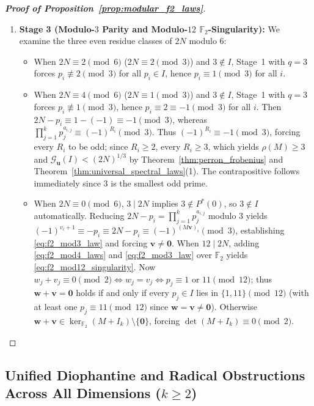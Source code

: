 \documentclass[11pt,a4paper]{article}
\theoremstyle{definition}
\begin{document}
\begin{proof}[\textbf{Proof of Proposition~\ref{prop:modular_f2_laws}}]
\begin{enumerate}
    \item \textbf{Stage 3 (Modulo-$3$ Parity and Modulo-$12$ $\mathbb{F}_2$-Singularity):} We examine the three even residue classes of $2N$ modulo $6$:
    \begin{itemize}
        \item When $2N \equiv 2 \pmod 6$ ($2N \equiv 2 \pmod 3$) and $3 \notin I$, Stage~1 with $q = 3$ forces $p_i \not\equiv 2 \pmod 3$ for all $p_i \in I$, hence $p_i \equiv 1 \pmod 3$ for all $i$.
        \item When $2N \equiv 4 \pmod 6$ ($2N \equiv 1 \pmod 3$) and $3 \notin I$, Stage~1 with $q = 3$ forces $p_i \not\equiv 1 \pmod 3$, hence $p_i \equiv 2 \equiv -1 \pmod 3$ for all $i$. Then $2N - p_i \equiv 1 - (-1) \equiv -1 \pmod 3$, whereas $\prod_{j=1}^k p_j^{a_{i,j}} \equiv (-1)^{R_i} \pmod 3$. Thus $(-1)^{R_i} \equiv -1 \pmod 3$, forcing every $R_i$ to be odd; since $R_i \ge 2$, every $R_i \ge 3$, which yields $\rho(M) \ge 3$ and $\mathcal{G}_{\mathbf{u}}(I) < (2N)^{1/3}$ by Theorem~\ref{thm:perron_frobenius} and Theorem~\ref{thm:universal_spectral_laws}(1). The contrapositive follows immediately since $3$ is the smallest odd prime.
        \item When $2N \equiv 0 \pmod 6$, $3 \mid 2N$ implies $3 \notin P^*(0)$, so $3 \notin I$ automatically. Reducing $2N - p_i = \prod_{j=1}^k p_j^{a_{i,j}}$ modulo $3$ yields $(-1)^{v_i + 1} \equiv -p_i \equiv 2N - p_i \equiv (-1)^{(M\mathbf{v})_i} \pmod 3$, establishing \eqref{eq:f2_mod3_law} and forcing $\mathbf{v} \neq \mathbf{0}$. When $12 \mid 2N$, adding \eqref{eq:f2_mod4_laws} and \eqref{eq:f2_mod3_law} over $\mathbb{F}_2$ yields \eqref{eq:f2_mod12_singularity}. Now $w_j + v_j \equiv 0 \pmod 2 \iff w_j = v_j \iff p_j \equiv 1 \text{ or } 11 \pmod{12}$; thus $\mathbf{w} + \mathbf{v} = \mathbf{0}$ holds if and only if every $p_j \in I$ lies in $\{1, 11\} \pmod{12}$ (with at least one $p_j \equiv 11 \pmod{12}$ since $\mathbf{w} = \mathbf{v} \neq \mathbf{0}$). Otherwise $\mathbf{w} + \mathbf{v} \in \ker_{\mathbb{F}_2}(M + I_k) \setminus \{\mathbf{0}\}$, forcing $\det(M + I_k) \equiv 0 \pmod 2$.
    \end{itemize}
\end{enumerate}
\end{proof}

\subsection{Unified Diophantine and Radical Obstructions Across All Dimensions (\texorpdfstring{$k \ge 2$}{k >= 2})}
\label{subsec:diophantine_radical_obstructions}
\end{document}
